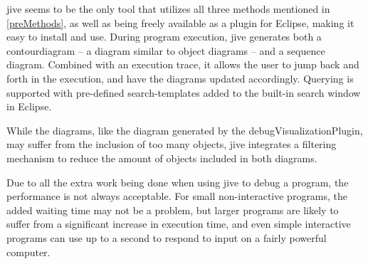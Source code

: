 \Gls{jive} seems to be the only tool that utilizes all three methods mentioned in \cref{preMethods}, as well as being freely available as a plugin for Eclipse, making it easy to install and use.
During program execution, \gls{jive} generates both a \gls{contourdiagram} \cite{Jayaraman1996} -- a diagram similar to object diagrams -- and a sequence diagram.
Combined with an execution trace, it allows the user to jump back and forth in the execution, and have the diagrams updated accordingly.
Querying is supported with pre-defined search-templates added to the built-in search window in Eclipse.

While the diagrams, like the diagram generated by the \gls{debugVisualizationPlugin}, may suffer from the inclusion of too many objects, \gls{jive} integrates a filtering mechanism to reduce the amount of objects included in both diagrams.

Due to all the extra work being done when using \gls{jive} to debug a program, the performance is not always acceptable.
For small non-interactive programs, the added waiting time may not be a problem, but larger programs are likely to suffer from a significant increase in execution time, and even simple interactive programs can use up to a second to respond to input on a fairly powerful computer.






